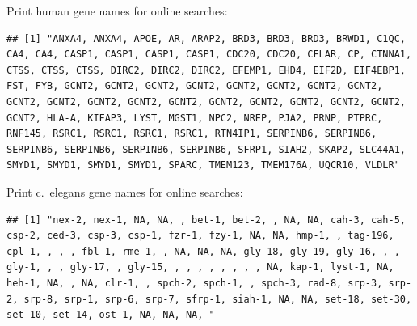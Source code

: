 \documentclass[
]{article}
\newenvironment{Shaded}{\begin{snugshade}}{\end{snugshade}}
\newcommand{\DataTypeTok}[1]{\textcolor[rgb]{0.13,0.29,0.53}{#1}}
\newcommand{\KeywordTok}[1]{\textcolor[rgb]{0.13,0.29,0.53}{\textbf{#1}}}
\newcommand{\NormalTok}[1]{#1}
\newcommand{\OperatorTok}[1]{\textcolor[rgb]{0.81,0.36,0.00}{\textbf{#1}}}
\newcommand{\StringTok}[1]{\textcolor[rgb]{0.31,0.60,0.02}{#1}}
\begin{document}
Print human gene names for online searches:

\begin{Shaded}
\end{Shaded}

\begin{verbatim}
## [1] "ANXA4, ANXA4, APOE, AR, ARAP2, BRD3, BRD3, BRD3, BRWD1, C1QC, CA4, CA4, CASP1, CASP1, CASP1, CASP1, CDC20, CDC20, CFLAR, CP, CTNNA1, CTSS, CTSS, CTSS, DIRC2, DIRC2, DIRC2, EFEMP1, EHD4, EIF2D, EIF4EBP1, FST, FYB, GCNT2, GCNT2, GCNT2, GCNT2, GCNT2, GCNT2, GCNT2, GCNT2, GCNT2, GCNT2, GCNT2, GCNT2, GCNT2, GCNT2, GCNT2, GCNT2, GCNT2, GCNT2, GCNT2, HLA-A, KIFAP3, LYST, MGST1, NPC2, NREP, PJA2, PRNP, PTPRC, RNF145, RSRC1, RSRC1, RSRC1, RSRC1, RTN4IP1, SERPINB6, SERPINB6, SERPINB6, SERPINB6, SERPINB6, SERPINB6, SFRP1, SIAH2, SKAP2, SLC44A1, SMYD1, SMYD1, SMYD1, SMYD1, SPARC, TMEM123, TMEM176A, UQCR10, VLDLR"
\end{verbatim}

Print c.~elegans gene names for online searches:

\begin{Shaded}
\end{Shaded}

\begin{verbatim}
## [1] "nex-2, nex-1, NA, NA, , bet-1, bet-2, , NA, NA, cah-3, cah-5, csp-2, ced-3, csp-3, csp-1, fzr-1, fzy-1, NA, NA, hmp-1, , tag-196, cpl-1, , , , fbl-1, rme-1, , NA, NA, NA, gly-18, gly-19, gly-16, , , gly-1, , , gly-17, , gly-15, , , , , , , , , NA, kap-1, lyst-1, NA, heh-1, NA, , NA, clr-1, , spch-2, spch-1, , spch-3, rad-8, srp-3, srp-2, srp-8, srp-1, srp-6, srp-7, sfrp-1, siah-1, NA, NA, set-18, set-30, set-10, set-14, ost-1, NA, NA, NA, "
\end{verbatim}
\end{document}
